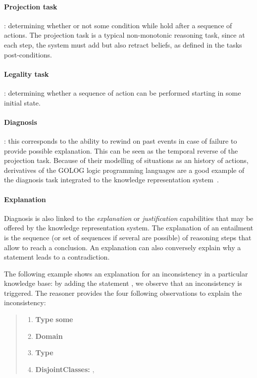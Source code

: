 \paragraph{Projection task}: determining whether or not some condition while
hold after a sequence of actions. The projection task is a typical
non-monotonic reasoning task, since at each step, the system must add but also
retract beliefs, as defined in the tasks post-conditions.

\paragraph{Legality task}: determining whether a sequence of action can be
performed starting in some initial state.

\paragraph{Diagnosis}: this corresponds to the ability to rewind on past events
in case of failure to provide possible explanation. This can be seen as the
temporal reverse of the projection task. Because of their modelling of
situations as an history of actions, derivatives of the GOLOG logic programming
languages are a good example of the diagnosis task integrated to the knowledge
representation system~\cite{Gspandl2011}.

\paragraph{Explanation} Diagnosis is also linked to the \emph{explanation} or
\emph{justification} capabilities that may be offered by the knowledge
representation system. The explanation of an entailment is the sequence (or
set of sequences if several are possible) of reasoning steps that allow to
reach a conclusion. An explanation can also conversely explain why a statement leads to a
contradiction.

The following example shows an explanation for an inconsistency in a particular
knowledge base: by adding the statement , we
observe that an inconsistency is triggered. The reasoner provides the four
following observations to explain the inconsistency:

\begin{quote}
\scriptsize
\begin{enumerate}
    \item {} {\bf Type}  {\bf some} 
    \item {} {\bf Domain} 
    \item {} {\bf Type} 
    \item {\bf DisjointClasses:} , 
\end{enumerate}
\normalsize
\end{quote}

